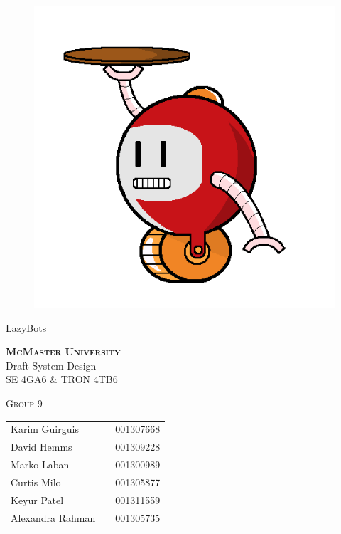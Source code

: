 \documentclass [10pt]{article}
\begin{document}
\begin {center} 

\thispagestyle{empty}
\vspace*{5cm}

\begin {figure}[h!]
\centering
\hspace{-10mm}\includegraphics [scale = .3, trim={.4cm 0 .8cm 0},clip] {figures/alfred.png}
\end {figure}

{%
\Huge{LazyBots} }

\vspace{1 cm}
{\Large\textbf{\textsc{McMaster University}}\\}  \vspace {1cm}
{\Large Draft System Design\\ \vspace {0.4 cm} SE 4GA6 \& TRON 4TB6}  \vspace {1cm}

{\large \textsc{Group 9} \\} \vspace{1cm}



\begin{tabular}{ l c  l}
Karim Guirguis & & 001307668 \\
David Hemms & & 001309228 \\
Marko Laban & & 001300989 \\
Curtis Milo & & 001305877 \\
Keyur Patel & & 001311559 \\
Alexandra Rahman & & 001305735
\end{tabular}


\end{center}
\end{document}
